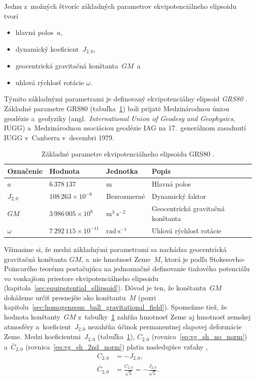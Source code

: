 \documentclass[a4paper, 12pt]{book}
\begin{document}
Jednu z~možných štvoríc základných parametrov ekvipotenciálneho elipsoidu tvorí
%
\begin{itemize}
\item hlavná polos~$a$,
%
\item dynamický koeficient~$J_{2,0}$,
%
\item geocentrická gravitačná konštanta~$GM$~a
%
\item uhlová rýchlosť rotácie $\omega$.
\end{itemize}
%
Týmito základnými parametrami je definovaný ekvipotenciálny elipsoid 
\emph{GRS80} \parencite[angl. \textit{Geodetic Reference 
System~1980};][]{GRS80}.  Základné parametre GRS80 
(tabuľka~\ref{tab:grs80_fundamental}) boli prijaté Medzinárodnou úniou geodézie 
a~geofyziky (angl.~\textit{International Union of Geodesy and Geophysics}, 
IUGG) a~Medzinárodnou asociáciou geodézie IAG na 17.~generálnom zasadnutí IUGG 
v~Canberra v~decembri 1979.

\begin{table}[b]
\begin{center}
\caption{Základné parametre ekvipotenciálneho elipsoidu GRS80 
\parencite{GRS80}.}
\label{tab:grs80_fundamental}
\small
\begin{tabular}{l l l l}
\hline
Označenie & Hodnota & Jednotka & Popis\\
\hline
$a$       & $6\,378\,137$ & m & Hlavná polos\\
$J_{2,0}$ & $108\,263 \times 10^{-8}$ & Bezrozmerné & Dynamický faktor\\
$GM$ & $3\,986\,005 \times 10^8$ & $\mathrm{m}^3 \ \mathrm{s}^{-2}$ 
& Geocentrická gravitačná konštanta\\
$\omega$ & $7\,292\,115 \times 10^{-11}$ & $\mathrm{rad} \ \mathrm{s}^{-1}$ 
& Uhlová rýchlosť rotácie\\
\hline
\end{tabular}
\end{center}
\end{table}

Všimnime si, že medzi základnými parametrami sa nachádza geocentrická 
gravitačná konštanta $GM$, a~nie hmotnosť Zeme~$M$, ktorá je podľa 
Stokesovho-Poincarého teorému postačujúca na jednoznačné definovanie tiažového 
potenciálu vo vonkajšom priestore ekvipotenciálneho elipsoidu 
(kapitola~\ref{sec:equipotential_ellipsoid}).  Dôvod je ten, že konštantu~$GM$ 
dokážeme určiť presnejšie ako konštantu~$M$ (pozri 
kapitolu~\ref{sec:homogeneous_ball_gravitational_field}).  Spomeňme tiež, že 
hodnota konštanty~$GM$ z~tabuľky~\ref{tab:grs80_fundamental} zahŕňa hmotnosť 
Zeme aj hmotnosť zemskej atmosféry a~koeficient~$J_{2,0}$ nezahŕňa účinok 
permanentnej slapovej deformácie Zeme.  Medzi koeficientmi~$J_{2,0}$ 
(tabuľka~\ref{tab:grs80_fundamental}), $C_{2,0}$ 
(rovnica~\ref{eq:vg_sh_no_norm}) a~$\bar{C}_{2,0}$ 
(rovnica~\ref{eq:vg_sh_2nd_norm}) platia nasledujúce vzťahy 
\parencite{Moritz1967,MoritzPhysicalGeodesy},
%
\begin{align}
\label{eq:c20_j20}
C_{2,0} &= -J_{2,0}{,}\\
%
\label{eq:c20_j20_2}
\bar{C}_{2,0} &= \frac{C_{2,0}}{\sqrt{5}} = -\frac{J_{2,0}}{\sqrt{5}}{.}
\end{align}
\end{document}
